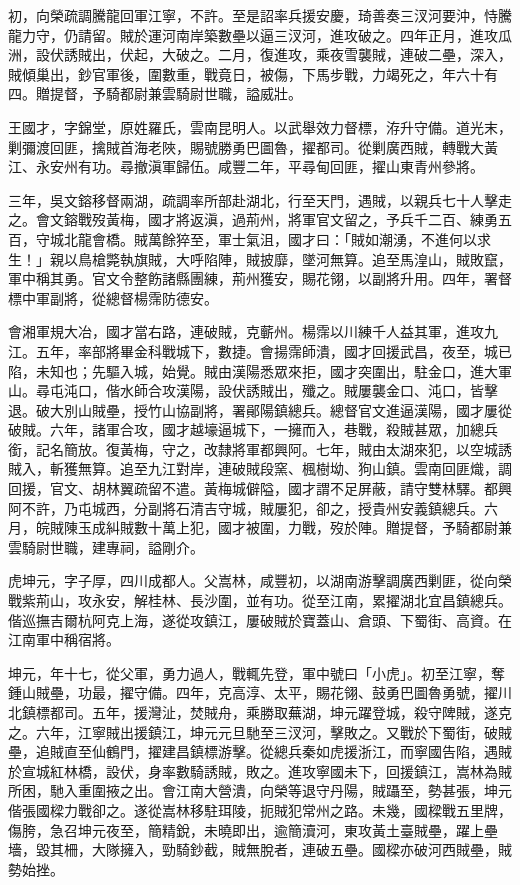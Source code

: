 \begin{pinyinscope}
初，向榮疏調騰龍回軍江寧，不許。至是詔率兵援安慶，琦善奏三汊河要沖，恃騰龍力守，仍請留。賊於運河南岸築數壘以逼三汊河，進攻破之。四年正月，進攻瓜洲，設伏誘賊出，伏起，大破之。二月，復進攻，乘夜雪襲賊，連破二壘，深入，賊傾巢出，鈔官軍後，圍數重，戰竟日，被傷，下馬步戰，力竭死之，年六十有四。贈提督，予騎都尉兼雲騎尉世職，謚威壯。

王國才，字錦堂，原姓羅氏，雲南昆明人。以武舉效力督標，洊升守備。道光末，剿彌渡回匪，擒賊首海老陜，賜號勝勇巴圖魯，擢都司。從剿廣西賊，轉戰大黃江、永安州有功。尋撤滇軍歸伍。咸豐二年，平尋甸回匪，擢山東青州參將。

三年，吳文鎔移督兩湖，疏調率所部赴湖北，行至天門，遇賊，以親兵七十人擊走之。會文鎔戰歿黃梅，國才將返滇，過荊州，將軍官文留之，予兵千二百、練勇五百，守城北龍會橋。賊萬餘猝至，軍士氣沮，國才曰：「賊如潮湧，不進何以求生！」親以鳥槍斃執旗賊，大呼陷陣，賊披靡，墜河無算。追至馬湟山，賊敗竄，軍中稱其勇。官文令整飭諸縣團練，荊州獲安，賜花翎，以副將升用。四年，署督標中軍副將，從總督楊霈防德安。

會湘軍規大冶，國才當右路，連破賊，克蘄州。楊霈以川練千人益其軍，進攻九江。五年，率部將畢金科戰城下，數捷。會揚霈師潰，國才回援武昌，夜至，城已陷，未知也；先驅入城，始覺。賊由漢陽悉眾來拒，國才突圍出，駐金口，進大軍山。尋屯沌口，偕水師合攻漢陽，設伏誘賊出，殲之。賊屢襲金口、沌口，皆擊退。破大別山賊壘，授竹山協副將，署鄖陽鎮總兵。總督官文進逼漢陽，國才屢從破賊。六年，諸軍合攻，國才越壕逼城下，一擁而入，巷戰，殺賊甚眾，加總兵銜，記名簡放。復黃梅，守之，改隸將軍都興阿。七年，賊由太湖來犯，以空城誘賊入，斬獲無算。追至九江對岸，連破賊段窯、楓樹坳、狗山鎮。雲南回匪熾，調回援，官文、胡林翼疏留不遣。黃梅城僻隘，國才謂不足屏蔽，請守雙林驛。都興阿不許，乃屯城西，分副將石清吉守城，賊屢犯，卻之，授貴州安義鎮總兵。六月，皖賊陳玉成糾賊數十萬上犯，國才被圍，力戰，歿於陣。贈提督，予騎都尉兼雲騎尉世職，建專祠，謚剛介。

虎坤元，字子厚，四川成都人。父嵩林，咸豐初，以湖南游擊調廣西剿匪，從向榮戰紫荊山，攻永安，解桂林、長沙圍，並有功。從至江南，累擢湖北宜昌鎮總兵。偕巡撫吉爾杭阿克上海，遂從攻鎮江，屢破賊於寶蓋山、倉頭、下蜀街、高資。在江南軍中稱宿將。

坤元，年十七，從父軍，勇力過人，戰輒先登，軍中號曰「小虎」。初至江寧，奪鍾山賊壘，功最，擢守備。四年，克高淳、太平，賜花翎、鼓勇巴圖魯勇號，擢川北鎮標都司。五年，援灣沚，焚賊舟，乘勝取蕪湖，坤元躍登城，殺守陴賊，遂克之。六年，江寧賊出援鎮江，坤元元旦馳至三汊河，擊敗之。又戰於下蜀街，破賊壘，追賊直至仙鶴門，擢建昌鎮標游擊。從總兵秦如虎援浙江，而寧國告陷，遇賊於宣城紅林橋，設伏，身率數騎誘賊，敗之。進攻寧國未下，回援鎮江，嵩林為賊所困，馳入重圍掖之出。會江南大營潰，向榮等退守丹陽，賊躡至，勢甚張，坤元偕張國樑力戰卻之。遂從嵩林移駐珥陵，扼賊犯常州之路。未幾，國樑戰五里牌，傷胯，急召坤元夜至，簡精銳，未曉即出，逾簡瀆河，東攻黃土臺賊壘，躍上壘墻，毀其柵，大隊擁入，勁騎鈔截，賊無脫者，連破五壘。國樑亦破河西賊壘，賊勢始挫。


\end{pinyinscope}
